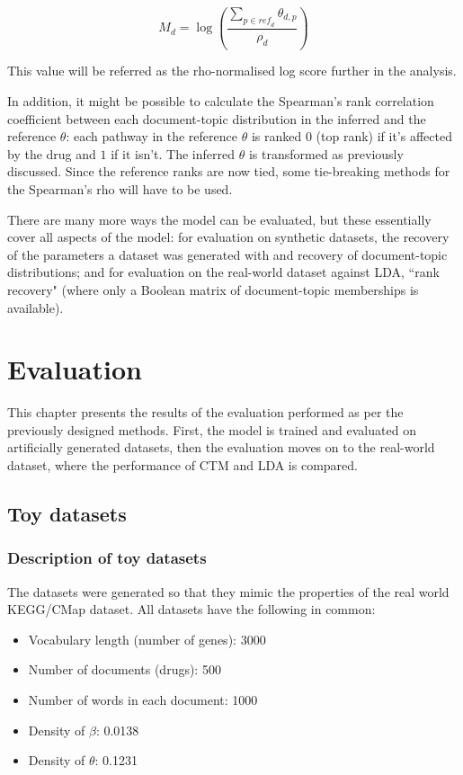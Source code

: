 \documentclass[12pt,a4paper,twoside,openright]{report}
\begin{document}
\begin{equation}\label{eq:rho-normalised-score}
M_d = \log\left(\frac{\sum\limits_{p \in \mathit{ref}_d}{\theta_{d, p}}}{\rho_d}\right)
\end{equation}

This value will be referred as the rho-normalised log score further in the analysis.

In addition, it might be possible to calculate the Spearman's rank correlation coefficient between each document-topic distribution in the inferred and the reference $\theta$: each pathway in the reference $\theta$ is ranked $0$ (top rank) if it's affected by the drug and $1$ if it isn't. The inferred $\theta$ is transformed as previously discussed. Since the reference ranks are now tied, some tie-breaking methods for the Spearman's rho will have to be used.

There are many more ways the model can be evaluated, but these essentially cover all aspects of the model: for evaluation on synthetic datasets, the recovery of the parameters a dataset was generated with and recovery of document-topic distributions; and for evaluation on the real-world dataset against LDA, ``rank recovery" (where only a Boolean matrix of document-topic memberships is available).

\chapter{Evaluation}

This chapter presents the results of the evaluation performed as per the previously designed methods. First, the model is trained and evaluated on artificially generated datasets, then the evaluation moves on to the real-world dataset, where the performance of CTM and LDA is compared.

\section{Toy datasets}

\subsection{Description of toy datasets}

The datasets were generated so that they mimic the properties of the real world KEGG/CMap dataset. All datasets have the following in common:

\begin{itemize}[noitemsep]
\item Vocabulary length (number of genes): 3000
\item Number of documents (drugs): 500
\item Number of words in each document: 1000
\item Density of $\beta$: 0.0138
\item Density of $\theta$: 0.1231
\end{itemize}
\end{document}
